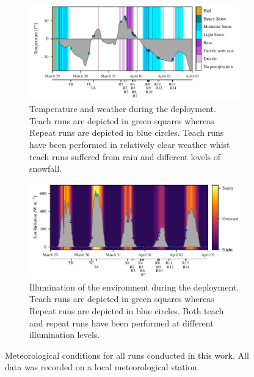 \begin{figure} [h!]
	\centering
		\begin{subfigure}[b]{\textwidth}
			\centering
			\includegraphics[]{figs/weatherCodes_withRunsNumbers.pdf}
			\caption{
				Temperature and weather during the deployment.
				Teach runs are depicted in green squares whereas Repeat runs are depicted in blue circles.
				Teach runs have been performed in relatively clear weather whist teach runs suffered from rain and different levels of snowfall.
				}
			\label{fig:meteo_weather}
			\vspace{0.2in}
		\end{subfigure}
		\begin{subfigure}[b]{\textwidth}
			\centering
		      \includegraphics[]{figs/ISWR_withRunsNumbers.pdf} %
		       \caption{
		       	Illumination of the environment during the deployment.
		        Teach runs are depicted in green squares whereas Repeat runs are depicted in blue circles.
		        Both teach and repeat runs have been performed at different illumination levels.
	       		}
			\label{fig:meteo_ISWR}
		\end{subfigure}
	\caption{
		Meteorological conditions for all runs conducted in this work.
		All data was recorded on a local meteorological station.
		}
	\label{fig:meteo_all}
\end{figure}


